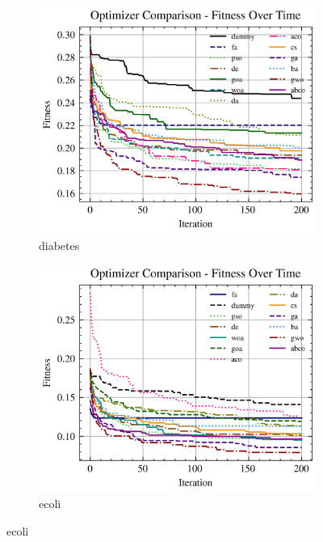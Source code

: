 \begin{figure}[htp]
    \begin{subfigure}[htp]{0.45\textwidth}
        \includegraphics[width=\textwidth]{imagenes/fitness_charts/img/binary/diabetes/optimizers_fitness_knn.png}
        \caption{diabetes}
    \end{subfigure}
    \begin{subfigure}[htp]{0.45\textwidth}
        \includegraphics[width=\textwidth]{imagenes/fitness_charts/img/binary/ecoli/optimizers_fitness_knn.png}
        \caption{ecoli}
    \end{subfigure}


\end{figure}
